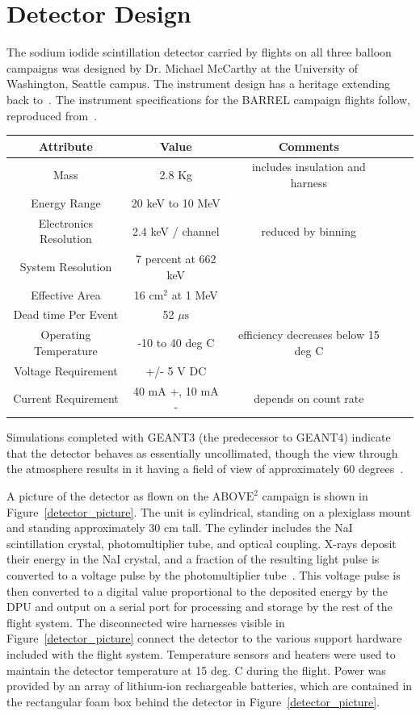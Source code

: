 \section{Detector Design}

The sodium iodide scintillation detector carried by flights on all three balloon campaigns was designed by Dr. Michael McCarthy at the University of Washington, Seattle campus. The instrument design has a heritage extending back to~\citet{winckler}. The instrument specifications for the BARREL campaign flights follow, reproduced from~\citet{Millan2014}. 

\begin{center}
\begin{tabular}{ |c|c|c|c|c| }
\hline
Attribute & Value & Comments \\
\hline
Mass & 2.8 Kg & includes insulation and harness \\
Energy Range & 20 keV to 10 MeV & \\
Electronics Resolution & 2.4 keV / channel & reduced by binning \\
System Resolution & 7 percent at 662 keV & \\
Effective Area & 16$\text{ cm}^2$ at 1 MeV & \\
Dead time Per Event & 52 $\mu\text{s}$ & \\
Operating Temperature & -10 to 40 deg C & efficiency decreases below 15 deg C \\
Voltage Requirement & +/- 5 V DC & \\
Current Requirement & 40 mA +, 10 mA - & depends on count rate\\
\hline
\end{tabular}
\end{center}

Simulations completed with GEANT3 (the predecessor to GEANT4) indicate that the detector behaves as essentially uncollimated, though the view through the atmosphere results in it having a field of view of approximately 60 degrees~\citet{Millan2014}. 

A picture of the detector as flown on the $\text{ABOVE}^2$ campaign is shown in Figure~\ref{detector_picture}. The unit is cylindrical, standing on a plexiglass mount and standing approximately 30 cm tall. The cylinder includes the NaI scintillation crystal, photomultiplier tube, and optical coupling. X-rays deposit their energy in the NaI crystal, and a fraction of the resulting light pulse is converted to a voltage pulse by the photomultiplier tube~\citet{Millan2014}. This voltage pulse is then converted to a digital value proportional to the deposited energy by the DPU and output on a serial port for processing and storage by the rest of the flight system. The disconnected wire harnesses visible in Figure~\ref{detector_picture} connect the detector to the various support hardware included with the flight system. Temperature sensors and heaters were used to maintain the detector temperature at 15 deg. C during the flight. Power was provided by an array of lithium-ion rechargeable batteries, which are contained in the rectangular foam box behind the detector in Figure~\ref{detector_picture}.

